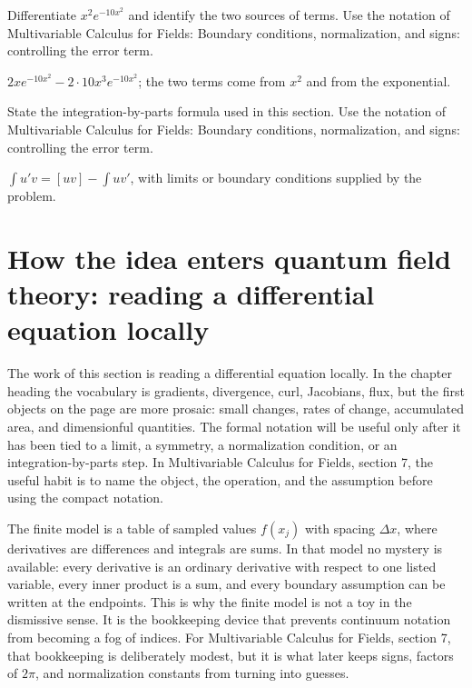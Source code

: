 \begin{exercise}
Differentiate \(x^2e^{-10x^2}\) and identify the two sources of terms.  Use the notation of Multivariable Calculus for Fields: Boundary conditions, normalization, and signs: controlling the error term.
\begin{answer}
\(2xe^{-10x^2}-2\cdot 10x^3e^{-10x^2}\); the two terms come from \(x^2\) and from the exponential.
\end{answer}
\end{exercise}

\begin{exercise}
State the integration-by-parts formula used in this section.  Use the notation of Multivariable Calculus for Fields: Boundary conditions, normalization, and signs: controlling the error term.
\begin{answer}
\(\int u'v=[uv]-\int uv'\), with limits or boundary conditions supplied by the problem.
\end{answer}
\end{exercise}



\section{How the idea enters quantum field theory: reading a differential equation locally}

The work of this section is reading a differential equation locally.  In the chapter heading the vocabulary is gradients, divergence, curl, Jacobians, flux, but the first objects on the page are more prosaic: small changes, rates of change, accumulated area, and dimensionful quantities.  The formal notation will be useful only after it has been tied to a limit, a symmetry, a normalization condition, or an integration-by-parts step.  In Multivariable Calculus for Fields, section 7, the useful habit is to name the object, the operation, and the assumption before using the compact notation.

The finite model is a table of sampled values \(f(x_j)\) with spacing \(\Delta x\), where derivatives are differences and integrals are sums.  In that model no mystery is available: every derivative is an ordinary derivative with respect to one listed variable, every inner product is a sum, and every boundary assumption can be written at the endpoints.  This is why the finite model is not a toy in the dismissive sense.  It is the bookkeeping device that prevents continuum notation from becoming a fog of indices.  For Multivariable Calculus for Fields, section 7, that bookkeeping is deliberately modest, but it is what later keeps signs, factors of \(2\pi\), and normalization constants from turning into guesses.


